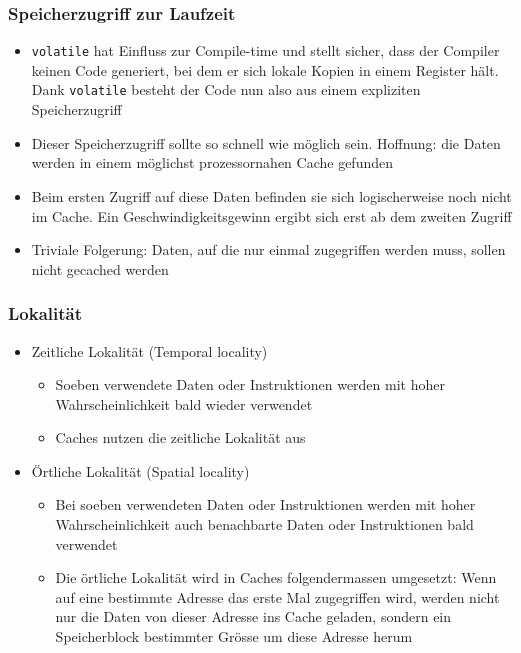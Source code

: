 \subsubsection{Speicherzugriff zur Laufzeit}
\begin{itemize}
	\item \lstinline{volatile} hat Einfluss zur Compile-time und stellt sicher, dass der Compiler keinen Code generiert, bei dem er sich lokale Kopien in einem Register hält. Dank \lstinline{volatile} besteht der Code nun also aus einem expliziten Speicherzugriff
	\item Dieser Speicherzugriff sollte so schnell wie möglich sein. Hoffnung: die Daten werden in einem möglichst prozessornahen Cache gefunden
	\item Beim ersten Zugriff auf diese Daten befinden sie sich logischerweise noch nicht im Cache. Ein Geschwindigkeitsgewinn ergibt sich erst ab dem zweiten Zugriff
	\item Triviale Folgerung: Daten, auf die nur einmal zugegriffen werden muss, sollen nicht gecached werden
\end{itemize}

\subsubsection{Lokalität}
\begin{minipage}[t]{6cm}
	\begin{itemize}
		\item Zeitliche Lokalität (Temporal locality)
		\begin{itemize}
			\item Soeben verwendete Daten oder Instruktionen werden mit hoher Wahrscheinlichkeit bald wieder verwendet
			\item Caches nutzen die zeitliche Lokalität aus
		\end{itemize}
	\end{itemize}
\end{minipage}
\begin{minipage}[t]{13cm}
	\begin{itemize}
		\item Örtliche Lokalität (Spatial locality)
		\begin{itemize}
			\item Bei soeben verwendeten Daten oder Instruktionen werden mit hoher Wahrscheinlichkeit auch benachbarte Daten oder Instruktionen bald verwendet
			\item Die örtliche Lokalität wird in Caches folgendermassen umgesetzt: Wenn auf eine bestimmte Adresse das erste Mal zugegriffen wird, werden nicht nur die Daten von dieser Adresse ins Cache geladen, sondern ein Speicherblock bestimmter Grösse um diese Adresse herum
		\end{itemize}
	\end{itemize}
\end{minipage}

